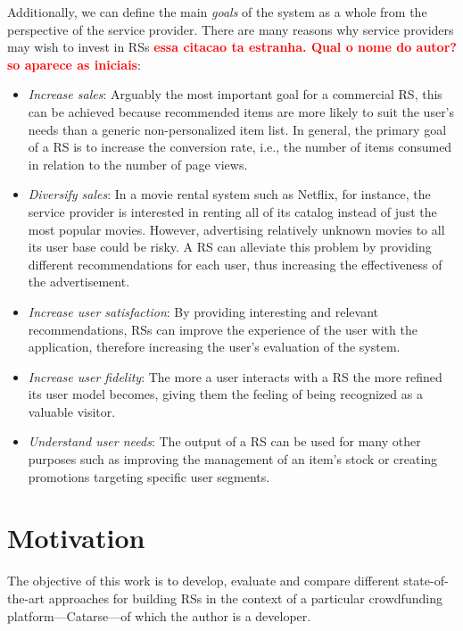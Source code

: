 \documentclass[cic,tc,english]{iiufrgs}
\newcommand{\bruno}[1]{\textcolor{red}{\textbf{#1}}}
\begin{document}
Additionally, we can define the main \emph{goals} of the system as a whole from the perspective of the service provider. There are many reasons why service providers may wish to invest in RSs \cite{N.N2010} \bruno{essa citacao ta estranha. Qual o nome do autor? so aparece as iniciais}:
\begin{itemize}
\item \emph{Increase sales}: Arguably the most important goal for a commercial RS, this can be achieved because recommended items are more likely to suit the user's needs than a generic non-personalized item list. In general, the primary goal of a RS is to increase the conversion rate, i.e., the number of items consumed in relation to the number of page views.
\item \emph{Diversify sales}: In a movie rental system such as Netflix, for instance, the service provider is interested in renting all of its catalog instead of just the most popular movies. However, advertising relatively unknown movies to all its user base could be risky. A RS can alleviate this problem by providing different recommendations for each user, thus increasing the effectiveness of the advertisement. 
\item \emph{Increase user satisfaction}: By providing interesting and relevant recommendations, RSs can improve the experience of the user with the application, therefore increasing the user's evaluation of the system.
\item \emph{Increase user fidelity}: The more a user interacts with a RS the more refined its user model becomes, giving them the feeling of being recognized as a valuable visitor.
\item \emph{Understand user needs}: The output of a RS can be used for many other purposes such as improving the management of an item's stock or creating promotions targeting specific user segments.
\end{itemize}

\section{Motivation} \label{motivation}
The objective of this work is to develop, evaluate and compare different state-of-the-art approaches for building RSs in the context of a particular crowdfunding platform---Catarse---of which the author is a developer.
\end{document}
